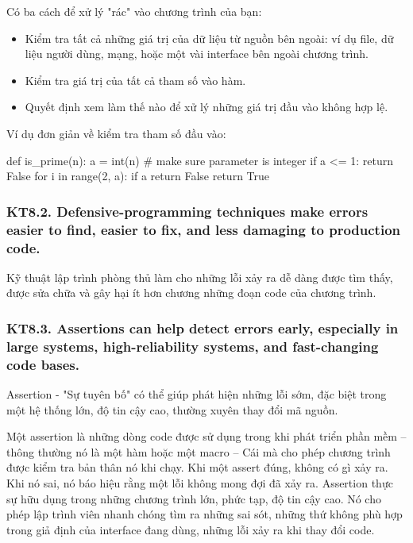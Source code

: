 \documentclass[12pt]{report}
\begin{document}
Có ba cách để xử lý "rác" vào chương trình của bạn:
\begin{itemize}
	\item Kiểm tra tất cả những giá trị của dữ liệu từ nguồn bên ngoài: ví dụ file, dữ liệu người dùng, mạng, hoặc một vài interface bên ngoài chương trình. 
	\item Kiểm tra giá trị của tất cả tham số vào hàm. 
	\item Quyết định xem làm thế nào để xử lý những giá trị đầu vào không hợp lệ.  
\end{itemize}
Ví dụ đơn giản về kiểm tra tham số đầu vào: 
\begin{python}
def is_prime(n):
	a = int(n) 	# make sure parameter is integer
	if a <= 1:
		return False
	for i in range(2, a):
		if a %
			return False
	return True 
\end{python}


\subsubsection{KT8.2. Defensive-programming techniques make errors easier to find, easier to fix, and less damaging to production code.}
Kỹ thuật lập trình phòng thủ làm cho những lỗi xảy ra dễ dàng được tìm thấy, được sửa chữa và gây hại ít hơn chương những đoạn code của chương trình. 

\subsubsection{KT8.3. Assertions can help detect errors early, especially in large systems, high-reliability systems, and fast-changing code bases.}
Assertion - "Sự tuyên bố" có thể giúp phát hiện những lỗi sớm, đặc biệt trong một hệ thống lớn, độ tin cậy cao, thường xuyên thay đổi mã nguồn. 
\vspace*{3mm}

Một assertion là những dòng code được sử dụng trong khi phát triển phần mềm -- 	thông thường nó là một hàm hoặc một macro -- Cái mà cho phép chương trình được kiểm tra bản thân nó khi chạy. Khi một assert đúng, không có gì xảy ra. Khi nó sai, nó báo hiệu rằng một lỗi không mong đợi đã xảy ra. Assertion thực sự hữu dụng trong những chương trình lớn, phức tạp, độ tin cậy cao. Nó cho phép lập trình viên nhanh chóng tìm ra những sai sót, những thứ không phù hợp trong giả định của interface đang dùng, những lỗi xảy ra khi thay đổi code. 
\end{document}
